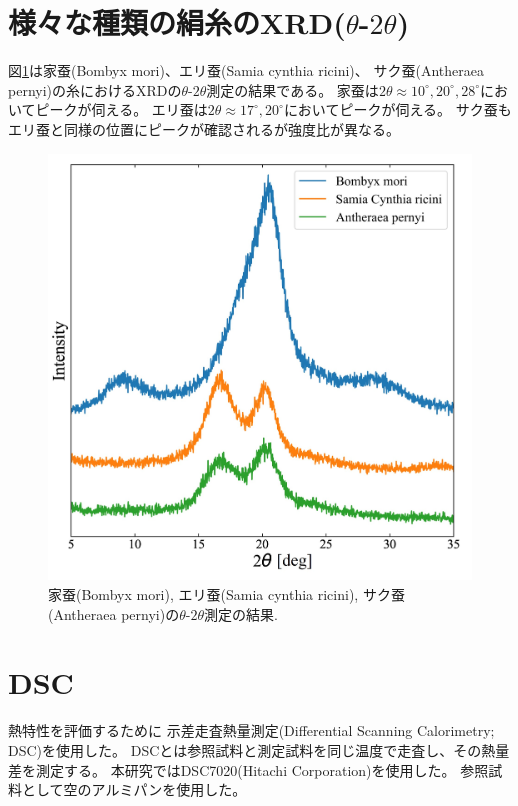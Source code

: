 \documentclass[dvipdfmx,12pt,a4paper]{jreport}
\begin{document}
	\section{様々な種類の絹糸のXRD($\theta$-$2\theta$)}
	図\ref{様々な絹糸XRD}は家蚕(Bombyx mori)、エリ蚕(Samia cynthia ricini)、
	サク蚕(Antheraea pernyi)の糸におけるXRDの$\theta$-$2\theta$測定の結果である。
	家蚕は$2\theta \approx 10^{\circ}, 20^{\circ}, 28^{\circ}$においてピークが伺える。
	エリ蚕は$2\theta \approx 17^{\circ}, 20^{\circ}$においてピークが伺える。
	サク蚕もエリ蚕と同様の位置にピークが確認されるが強度比が異なる。
	\begin{figure}[h]
		\centering
		\includegraphics[scale=0.8]{糸の種類別XRD.jpg}
		\caption{家蚕(Bombyx mori), エリ蚕(Samia cynthia ricini), 
		サク蚕(Antheraea pernyi)の$\theta$-$2\theta$測定の結果.}
		\label{様々な絹糸XRD}
	\end{figure}
	\newpage
	\section{DSC}
	\label{DSC}
	熱特性を評価するために
	示差走査熱量測定(Differential Scanning Calorimetry; DSC)を使用した。
	DSCとは参照試料と測定試料を同じ温度で走査し、その熱量差を測定する。
	本研究ではDSC7020(Hitachi Corporation)を使用した。
	参照試料として空のアルミパンを使用した。
\end{document}
